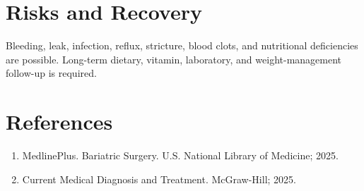 \section*{Risks and Recovery}
Bleeding, leak, infection, reflux, stricture, blood clots, and nutritional deficiencies are possible. Long-term dietary, vitamin, laboratory, and weight-management follow-up is required.
\section*{References}
\begin{enumerate}\item MedlinePlus. Bariatric Surgery. U.S. National Library of Medicine; 2025.\item Current Medical Diagnosis and Treatment. McGraw-Hill; 2025.\end{enumerate}
\clearpage

